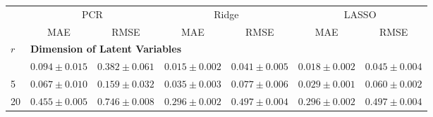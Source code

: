 \begin{tabular}{l*{6}{c}} 
\toprule 
& \multicolumn{2}{c}{PCR} & \multicolumn{2}{c}{Ridge} & \multicolumn{2}{c}{LASSO} \\ 
\cmidrule(lr){2-3} \cmidrule(lr){4-5} \cmidrule(lr){6-7} 
& MAE & RMSE & MAE & RMSE & MAE & RMSE \\ 
\midrule 
 \addlinespace 
\addlinespace 
 $r$ & \multicolumn{6}{l}{\textbf{Dimension of Latent Variables}} \\ 
 \addlinespace 
2 & $0.094 \pm 0.015$ & $0.382 \pm 0.061$ & $0.015 \pm 0.002$ & $0.041 \pm 0.005$ & $0.018 \pm 0.002$ & $0.045 \pm 0.004$ \\ 
5 & $0.067 \pm 0.010$ & $0.159 \pm 0.032$ & $0.035 \pm 0.003$ & $0.077 \pm 0.006$ & $0.029 \pm 0.001$ & $0.060 \pm 0.002$ \\ 
20 & $0.455 \pm 0.005$ & $0.746 \pm 0.008$ & $0.296 \pm 0.002$ & $0.497 \pm 0.004$ & $0.296 \pm 0.002$ & $0.497 \pm 0.004$ \\ 
\bottomrule 
 \end{tabular}